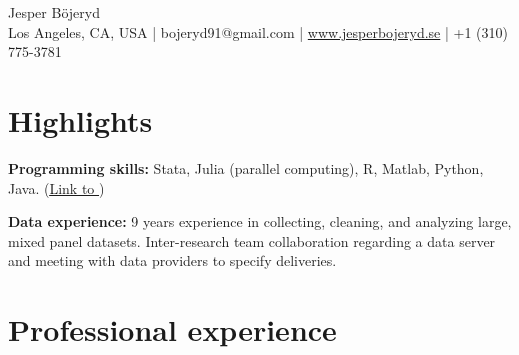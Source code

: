 \documentclass{clean_CV}
\author{Jesper Böjeryd}
\begin{document}
\begin{center}
    {\Huge Jesper Böjeryd}\\[6pt]
    Los Angeles, CA, USA | bojeryd91@gmail.com |
    \url{www.jesperbojeryd.se} | +1 (310) 775-3781
\end{center}


\section{Highlights}

\textbf{Programming skills:} Stata, Julia (parallel computing), R, Matlab, Python, Java. \quad (\uline{\href{https://github.com/bojeryd91}{Link to \faGithub{}}})

\textbf{Data experience:} 9 years experience in collecting, cleaning, and analyzing large, mixed panel datasets. Inter-research team collaboration regarding a data server and meeting with data providers to specify deliveries.
    




\section{Professional experience%
}

\end{document}
